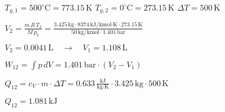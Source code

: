 \( T_{g,1} = 500^\circ \text{C} = 773.15 \, \text{K} \)  
\( T_{g,2} = 0^\circ \text{C} = 273.15 \, \text{K} \)  
\( \Delta T = 500 \, \text{K} \)  

\( V_2 = \frac{m \, R \, T_2}{M \, p_2} = \frac{3.425 \, \text{kg} \cdot 8374 \, \text{kJ/kmol·K} \cdot 273.15 \, \text{K}}{50 \, \text{kg/kmol} \cdot 1.401 \, \text{bar}} \)  

\( V_2 = 0.0041 \, \text{L} \quad \rightarrow \quad V_1 = 1.108 \, \text{L} \)  

\( W_{12} = \int p \, dV = 1.401 \, \text{bar} \cdot (V_2 - V_1) \)  

\( Q_{12} = c_V \cdot m \cdot \Delta T = 0.633 \, \frac{\text{kJ}}{\text{kg·K}} \cdot 3.425 \, \text{kg} \cdot 500 \, \text{K} \)  

\( Q_{12} = 1.081 \, \text{kJ} \)